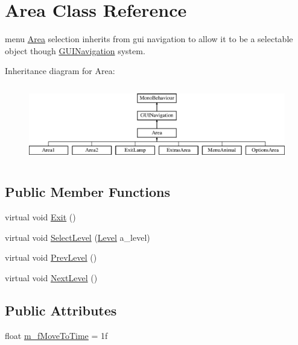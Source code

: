 \hypertarget{class_area}{}\section{Area Class Reference}
\label{class_area}


menu \mbox{\hyperlink{class_area}{Area}} selection inherits from gui navigation to allow it to be a selectable object though \mbox{\hyperlink{class_g_u_i_navigation}{G\+U\+I\+Navigation}} system.  


Inheritance diagram for Area\+:\begin{figure}[H]
\begin{center}
\leavevmode
\includegraphics[height=3.393939cm]{class_area}
\end{center}
\end{figure}
\subsection*{Public Member Functions}
\begin{DoxyCompactItemize}
\item 
virtual void \mbox{\hyperlink{class_area_a96ef46550ca800c223f4db8f0b93e86b}{Exit}} ()
\item 
virtual void \mbox{\hyperlink{class_area_a0f04f37327aab840cc0d4ba97c7d19ff}{Select\+Level}} (\mbox{\hyperlink{class_level}{Level}} a\+\_\+level)
\item 
virtual void \mbox{\hyperlink{class_area_a17eb7b6ddece1384c868a0c655cd98c4}{Prev\+Level}} ()
\item 
virtual void \mbox{\hyperlink{class_area_a097fdec8cbc515c14e45de2c9cd07046}{Next\+Level}} ()
\end{DoxyCompactItemize}
\subsection*{Public Attributes}
\begin{DoxyCompactItemize}
\item 
float \mbox{\hyperlink{class_area_a5083090842eb5956fa82fefad261df59}{m\+\_\+f\+Move\+To\+Time}} = 1f
\end{DoxyCompactItemize}
